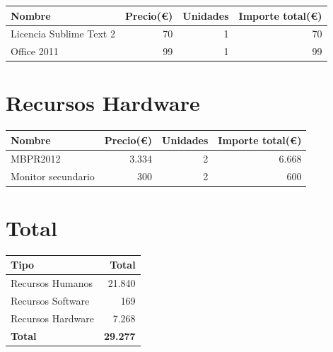\begin{center}
	\begin{tabular}{| l | r | r | r |}
		\hline
		Nombre					&	Precio(\euro)	&	Unidades	&	Importe total(\euro)	\\	\hline
		Licencia Sublime Text 2	& 	70				&	1 			& 	70						\\	\hline
		Office 2011 			&	99				&	1			&	99						\\
		\hline
	\end{tabular}
\end{center}

\section{Recursos Hardware}

\begin{center}
	\begin{tabular}{| l | r | r | r |}
		\hline
		Nombre				&	Precio(\euro)	&	Unidades	&	Importe total(\euro)	\\	\hline
		MBPR2012			& 	3.334			&	2 			&	6.668					\\	\hline
		Monitor secundario	&	300				&	2			&	600						\\
		\hline
	\end{tabular}
\end{center}

\section{Total}

\begin{center}
	\begin{tabular}{| l | r |}
		\hline
		Tipo				&	Total			\\	\hline
		Recursos Humanos	& 	21.840			\\	\hline
		Recursos Software	&	169				\\	\hline
		Recursos Hardware	&	7.268			\\	\hline
		\textbf{Total}		&	\textbf{29.277}	\\
		\hline
	\end{tabular}
\end{center}